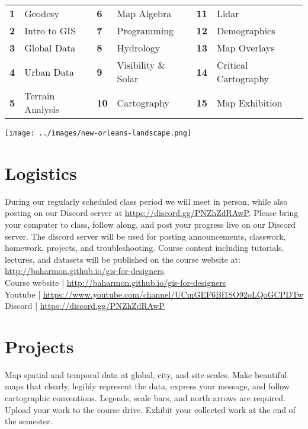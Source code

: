 \documentclass[11pt,article,oneside]{memoir}
\begin{document}
\begin{table}[H]
\begin{tabular}{l l @{\hskip 0.5cm} l l @{\hskip 0.5cm} l l}
\small
\textbf{1} & Geodesy & \textbf{6} & Map Algebra & \textbf{11} & Lidar\\
\textbf{2} & Intro to GIS & \textbf{7} & Programming & \textbf{12} & Demographics\\
\textbf{3} & Global Data & \textbf{8} & Hydrology & \textbf{13} & Map Overlays\\
\textbf{4} & Urban Data & \textbf{9} & Visibility \& Solar & \textbf{14} & Critical Cartography\\
\textbf{5} & Terrain Analysis & \textbf{10} & Cartography & \textbf{15} & Map Exhibition\\
\end{tabular}
\end{table}

\vspace*{1em}

\texttt{[image: ../images/new-orleans-landscape.png]}

\clearpage

\section{Logistics}

During our regularly scheduled class period
we will meet in person, while also posting
on our Discord server at \url{https://discord.gg/PNZhZdRAwP}. 
Please bring your computer to class, follow along, 
and post your progress live on our Discord server. 
The discord server will be used for posting
announcements, classwork, homework, projects, and troubleshooting. 
Course content including tutorials, lectures, and datasets
will be published on the course website at:
\url{http://baharmon.github.io/gis-for-designers}.\\

\noindent
Course website | \url{http://baharmon.github.io/gis-for-designers}\\
Youtube | \url{https://www.youtube.com/channel/UCmGEF6Bf1SO92oLQoGCPDTw}\\
Discord | \url{https://discord.gg/PNZhZdRAwP}\\


\section{Projects}
Map spatial and temporal data
at global, city, and site scales.
Make beautiful maps that 
clearly, legibly represent the data,
express your message, and
follow cartographic conventions.
Legends, scale bars, and north arrows are required.
Upload your work to the course drive.
Exhibit your collected work at the end of the semester.\\
\end{document}
